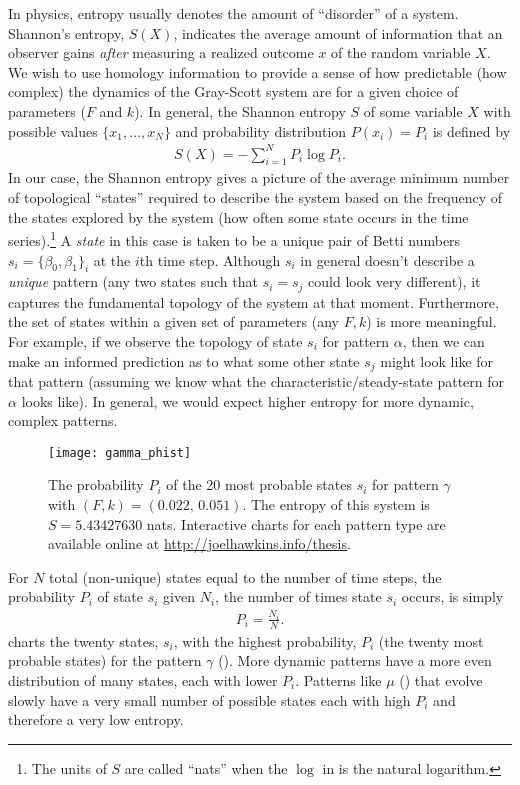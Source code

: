 In physics, entropy usually denotes the amount of ``disorder'' of a system. Shannon's entropy, $S(X)$, indicates the average amount of information that an observer gains \emph{after} measuring a realized outcome $x$ of the random variable $X$. We wish to use homology information to provide a sense of how predictable (how complex) the dynamics of the Gray-Scott system are for a given choice of parameters ($F$ and $k$). In general, the Shannon entropy $S$ of some variable $X$ with possible values $\{ x_1, \ldots, x_N \}$ and probability distribution $P(x_i) = P_i$ is defined by
\begin{align} \label{eq:shannon}
	S(X) = - \sum_{i=1}^{N} P_i \log{ P_i}.
\end{align}
In our case, the Shannon entropy gives a picture of the average minimum number of topological ``states'' required to describe the system based on the frequency of the states explored by the system (\ie how often some state occurs in the time series).\footnote{The units of $S$ are called ``nats'' when the $\log$ in  is the natural logarithm.} A \emph{state} in this case is taken to be a unique pair of Betti numbers $s_i = \{ \beta_0, \beta_1 \}_i$ at the $i$th time step. Although $s_i$ in general doesn't describe a \emph{unique} pattern (any two states such that $s_i = s_j$ could look very different), it captures the fundamental topology of the system at that moment. Furthermore, the set of states within a given set of parameters (any $F, k$) is more meaningful. For example, if we observe the topology of state $s_i$ for pattern $\alpha$, then we can make an informed prediction as to what some other state $s_j$ might look like for that pattern (assuming we know what the characteristic/steady-state pattern for $\alpha$ looks like). In general, we would expect higher entropy for more dynamic, complex patterns.

\begin{figure}[h]
	\centering
	\texttt{[image: gamma\_phist]}
                \caption{The probability $P_i$ of the 20 most probable states $s_i$ for pattern $\gamma$ with $(F, k) = (0.022,\, 0.051)$. The entropy of this system is $S = 5.43427630$ nats. Interactive charts for each pattern type are available online at \url{http://joelhawkins.info/thesis}.}
                \label{fig:gamma_phist}
\end{figure}

For $N$ total (non-unique) states equal to the number of time steps, the probability $P_i$ of state $s_i$ given $N_i$, the number of times state $s_i$ occurs, is simply
\begin{align} \label{eq:Pi}
	P_i = \frac{N_i}{N}.
\end{align}
 charts the twenty states, $s_i$, with the highest probability, $P_i$ (\ie the twenty most probable states) for the pattern $\gamma$ (). More dynamic patterns have a more even distribution of many states, each with lower $P_i$. Patterns like $\mu$ () that evolve slowly have a very small number of possible states each with high $P_i$ and therefore a very low entropy.

